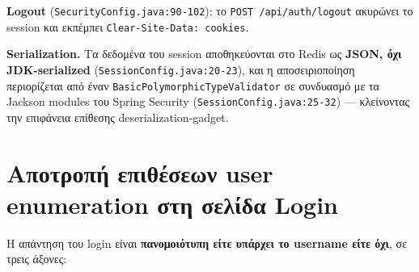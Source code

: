 \documentclass[11pt,a4paper]{article}
\newcommand{\code}[1]{\texttt{#1}}
\begin{document}
\textbf{Logout} (\code{SecurityConfig.java:90-102}): το \code{POST /api/auth/logout} ακυρώνει το
session και εκπέμπει \code{Clear-Site-Data: cookies}.

\textbf{Serialization.} Τα δεδομένα του session αποθηκεύονται στο Redis ως \textbf{JSON, όχι
JDK-serialized} (\code{SessionConfig.java:20-23}), και η αποσειριοποίηση περιορίζεται από έναν
\code{Basic\allowbreak{}Polymorphic\allowbreak{}TypeValidator} σε συνδυασμό με τα Jackson modules του Spring Security
(\code{SessionConfig.java:25-32}) --- κλείνοντας την επιφάνεια επίθεσης deserialization-gadget.

\section{Αποτροπή επιθέσεων user enumeration στη σελίδα Login}
\label{sec:enumeration}

Η απάντηση του login είναι \textbf{πανομοιότυπη είτε υπάρχει το username είτε όχι}, σε τρεις άξονες:
\end{document}
